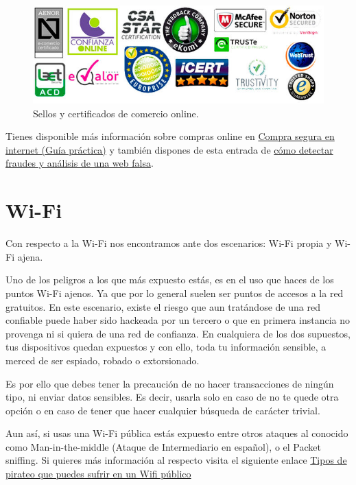 \documentclass[
  a4paper,
  openany]{book}
\begin{document}
\begin{figure}

{\centering \includegraphics[width=0.75\linewidth]{images/sellos-de-confianza-online} 

}

\caption{Sellos y certificados de comercio online.}\label{fig:unnamed-chunk-11}
\end{figure}

Tienes disponible más información sobre compras online en \href{https://www.aepd.es/sites/default/files/2019-09/guia-compra-segura-digital-web.pdf}{Compra segura en internet (Guía práctica)} y también dispones de esta entrada de \href{https://www.osi.es/es/actualidad/blog/2018/08/08/detectando-fraudes-analisis-de-una-web-de-venta-falsa}{cómo detectar fraudes y análisis de una web falsa}.

\hypertarget{wi-fi}{%
\section{Wi-Fi}\label{wi-fi}}

Con respecto a la Wi-Fi nos encontramos ante dos escenarios: Wi-Fi propia y Wi-Fi ajena.

Uno de los peligros a los que más expuesto estás, es en el uso que haces de los puntos Wi-Fi ajenos. Ya que por lo general suelen ser puntos de accesos a la red gratuitos. En este escenario, existe el riesgo que aun tratándose de una red confiable puede haber sido hackeada por un tercero o que en primera instancia no provenga ni si quiera de una red de confianza. En cualquiera de los dos supuestos, tus dispositivos quedan expuestos y con ello, toda tu información sensible, a merced de ser espiado, robado o extorsionado.

Es por ello que debes tener la precaución de no hacer transacciones de ningún tipo, ni enviar datos sensibles. Es decir, usarla solo en caso de no te quede otra opción o en caso de tener que hacer cualquier búsqueda de carácter trivial.

Aun así, si usas una Wi-Fi pública estás expuesto entre otros ataques al conocido como Man-in-the-middle (Ataque de Intermediario en español), o el Packet sniffing. Si quieres más información al respecto visita el siguiente enlace \href{https://as.com/meristation/2020/02/04/betech/1580856719_548183.html}{Tipos de pirateo que puedes sufrir en un Wifi público}
\end{document}
